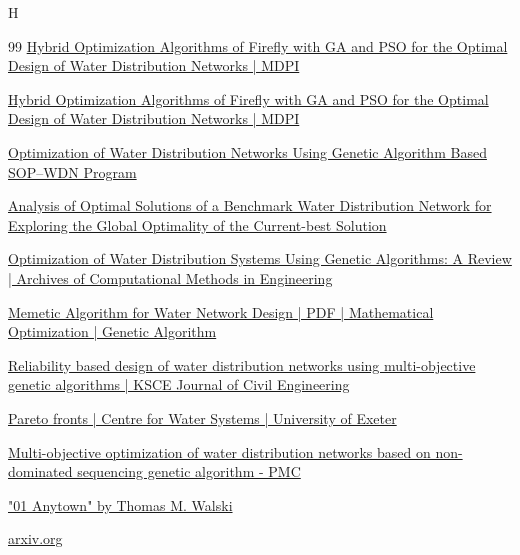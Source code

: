 H\documentclass[12pt, a4paper]{article}
\begin{document}
\begin{thebibliography}{99}
 \href{https://www.mdpi.com/2073-4441/15/10/1906}{Hybrid Optimization Algorithms of Firefly with GA and PSO for the Optimal Design of Water Distribution Networks | MDPI}

 \href{https://www.mdpi.com/2073-4441/15/10/1906}{Hybrid Optimization Algorithms of Firefly with GA and PSO for the Optimal Design of Water Distribution Networks | MDPI}

 \href{https://www.mdpi.com/2073-4441/14/6/851}{Optimization of Water Distribution Networks Using Genetic Algorithm Based SOP--WDN Program}

 \href{https://chijournal.org/H527}{Analysis of Optimal Solutions of a Benchmark Water Distribution Network for Exploring the Global Optimality of the Current-best Solution}

 \href{https://link.springer.com/article/10.1007/s11831-023-09944-7}{Optimization of Water Distribution Systems Using Genetic Algorithms: A Review | Archives of Computational Methods in Engineering}

 \href{https://www.scribd.com/document/851139427/A-memetic-algorithm-applied-to-the-design-of-water-distribution-networks}{Memetic Algorithm for Water Network Design | PDF | Mathematical Optimization | Genetic Algorithm}

 \href{https://link.springer.com/article/10.1007/BF02831784}{Reliability based design of water distribution networks using multi-objective genetic algorithms | KSCE Journal of Civil Engineering}

 \href{https://www.exeter.ac.uk/research/centres/cws/resources/benchmarks/pareto/}{Pareto fronts | Centre for Water Systems | University of Exeter}

 \href{https://pmc.ncbi.nlm.nih.gov/articles/PMC9704581/}{Multi-objective optimization of water distribution networks based on non-dominated sequencing genetic algorithm - PMC}

 \href{https://uknowledge.uky.edu/wdst_models/1/}{"01 Anytown" by Thomas M. Walski}

 \href{https://arxiv.org/pdf/2503.17167}{arxiv.org}

\end{thebibliography}
\end{document}
